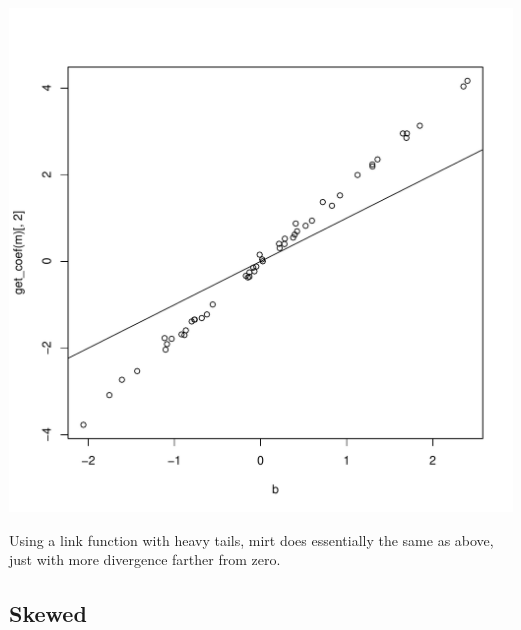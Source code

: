\documentclass{article}\usepackage[]{graphicx}\usepackage[]{color}
\makeatletter
\def\maxwidth{ %
  \ifdim\Gin@nat@width>\linewidth
    \linewidth
  \else
    \Gin@nat@width
  \fi
}
\newenvironment{knitrout}{}{} %
\makeatother
\begin{document}
\begin{knitrout}
\color{fgcolor}
\includegraphics[width=\maxwidth]{figure/unnamed-chunk-11-1} 

\end{knitrout}

Using a link function with heavy tails, mirt does essentially the same as above, just with more divergence farther from zero.

\subsection{Skewed}
\end{document}
